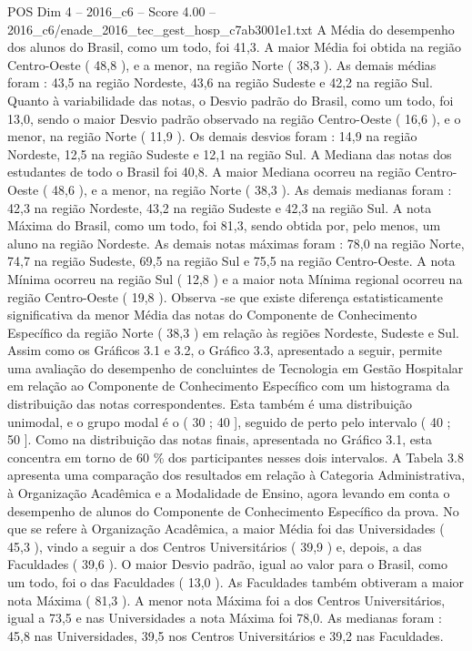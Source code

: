 \begin{textsample}{POS Dim 4 – 2016\_c6 – Score 4.00 – 2016\_c6/enade\_2016\_tec\_gest\_hosp\_c7ab3001e1.txt}
A Média do desempenho dos alunos do Brasil, como um todo, foi 41,3.
A maior Média foi obtida na região Centro-Oeste ( 48,8 ), e a menor, na região Norte ( 38,3 ).
As demais médias foram : 43,5 na região Nordeste, 43,6 na região Sudeste e 42,2 na região Sul.
Quanto à variabilidade das notas, o Desvio padrão do Brasil, como um todo, foi 13,0, sendo o maior Desvio padrão observado na região Centro-Oeste ( 16,6 ), e o menor, na região Norte ( 11,9 ).
Os demais desvios foram : 14,9 na região Nordeste, 12,5 na região Sudeste e 12,1 na região Sul.
A Mediana das notas dos estudantes de todo o Brasil foi 40,8.
A maior Mediana ocorreu na região Centro-Oeste ( 48,6 ), e a menor, na região Norte ( 38,3 ).
As demais medianas foram : 42,3 na região Nordeste, 43,2 na região Sudeste e 42,3 na região Sul.
A nota Máxima do Brasil, como um todo, foi 81,3, sendo obtida por, pelo menos, um aluno na região Nordeste.
As demais notas máximas foram : 78,0 na região Norte, 74,7 na região Sudeste, 69,5 na região Sul e 75,5 na região Centro-Oeste.
A nota Mínima ocorreu na região Sul ( 12,8 ) e a maior nota Mínima regional ocorreu na região Centro-Oeste ( 19,8 ).
Observa -se que existe diferença estatisticamente significativa da menor Média das notas do Componente de Conhecimento Específico da região Norte ( 38,3 ) em relação às regiões Nordeste, Sudeste e Sul.
Assim como os Gráficos 3.1 e 3.2, o Gráfico 3.3, apresentado a seguir, permite uma avaliação do desempenho de concluintes de Tecnologia em Gestão Hospitalar em relação ao Componente de Conhecimento Específico com um histograma da distribuição das notas correspondentes.
Esta também é uma distribuição unimodal, e o grupo modal é o ( 30 ; 40 ], seguido de perto pelo intervalo ( 40 ; 50 ].
Como na distribuição das notas finais, apresentada no Gráfico 3.1, esta concentra em torno de 60 \% dos participantes nesses dois intervalos.
A Tabela 3.8 apresenta uma comparação dos resultados em relação à Categoria Administrativa, à Organização Acadêmica e a Modalidade de Ensino, agora levando em conta o desempenho de alunos do Componente de Conhecimento Específico da prova.
No que se refere à Organização Acadêmica, a maior Média foi das Universidades ( 45,3 ), vindo a seguir a dos Centros Universitários ( 39,9 ) e, depois, a das Faculdades ( 39,6 ).
O maior Desvio padrão, igual ao valor para o Brasil, como um todo, foi o das Faculdades ( 13,0 ).
As Faculdades também obtiveram a maior nota Máxima ( 81,3 ).
A menor nota Máxima foi a dos Centros Universitários, igual a 73,5 e nas Universidades a nota Máxima foi 78,0.
As medianas foram : 45,8 nas Universidades, 39,5 nos Centros Universitários e 39,2 nas Faculdades.

\end{textsample}
